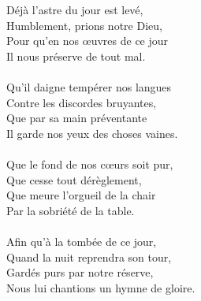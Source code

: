 Déjà l'astre du jour est levé,\\
Humblement, prions notre Dieu,\\
Pour qu'en nos œuvres de ce jour\\
Il nous préserve de tout mal.\\
\\
Qu'il daigne tempérer nos langues\\
Contre les discordes bruyantes,\\
Que par sa main préventante\\
Il garde nos yeux des choses vaines.\\
\\
Que le fond de nos cœurs soit pur,\\
Que cesse tout dérèglement,\\
Que meure l'orgueil de la chair\\
Par la sobriété de la table.\\
\\
Afin qu'à la tombée de ce jour,\\
Quand la nuit reprendra son tour,\\
Gardés purs par notre réserve,\\
Nous lui chantions un hymne de gloire.